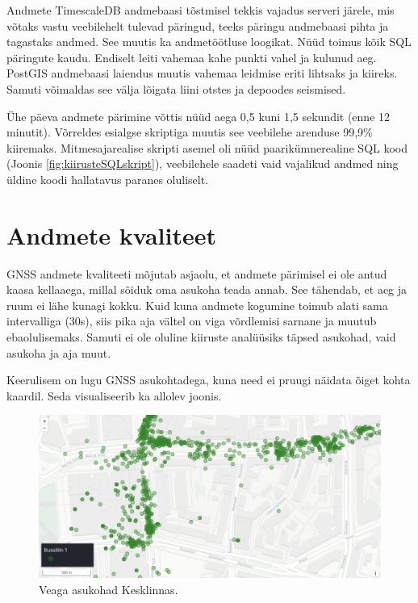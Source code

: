 Andmete TimescaleDB andmebaasi tõstmisel tekkis vajadus serveri järele, mis võtaks vastu veebilehelt tulevad päringud, teeks päringu andmebaasi pihta ja tagastaks andmed. See muutis ka andmetöötluse loogikat. Nüüd toimus kõik SQL päringute kaudu. Endiselt leiti vahemaa kahe punkti vahel ja kulunud aeg. PostGIS andmebaasi laiendus muutis vahemaa leidmise eriti lihtsaks ja kiireks. Samuti võimaldas see välja lõigata liini otstes ja depoodes seismised.

Ühe päeva andmete pärimine võttis nüüd aega 0,5 kuni 1,5 sekundit (enne 12 minutit). Võrreldes esialgse skriptiga muutis see veebilehe arenduse 99,9\% kiiremaks. Mitmesajarealise skripti asemel oli nüüd paarikümnerealine SQL kood (Joonis \ref{fig:kiirusteSQLskript}), veebilehele saadeti vaid vajalikud andmed ning üldine koodi hallatavus paranes oluliselt.

\section{Andmete kvaliteet}

GNSS andmete kvaliteeti mõjutab asjaolu, et andmete pärimisel ei ole antud kaasa kellaaega, millal sõiduk oma asukoha teada annab. See tähendab, et aeg ja ruum ei lähe kunagi kokku. Kuid kuna andmete kogumine toimub alati sama intervalliga (30s), siis pika aja vältel on viga võrdlemisi sarnane ja muutub ebaolulisemaks. Samuti ei ole oluline kiiruste analüüsiks täpsed asukohad, vaid asukoha ja aja muut. 

Keerulisem on lugu GNSS asukohtadega, kuna need ei pruugi näidata õiget kohta kaardil. Seda visualiseerib ka allolev joonis.

\begin{figure}[H] %
    \centering
    \includegraphics[width=.8\textwidth]{figures/gpsvead.png} %
    \caption{Veaga asukohad Kesklinnas.} %
    \label{fig:gpsnoise} %
\end{figure}

